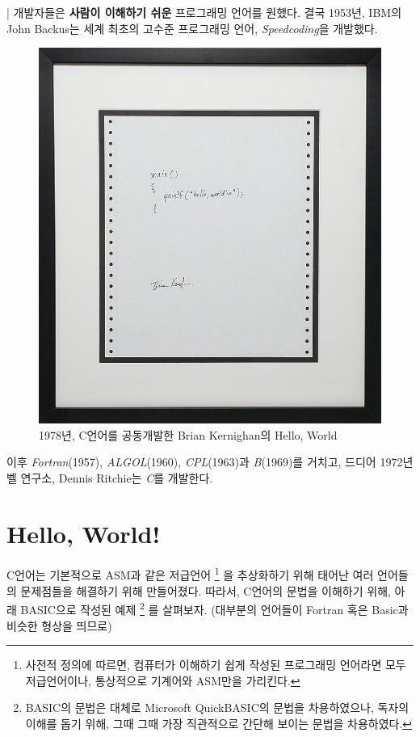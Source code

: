 \documentclass{article}
\begin{document}
| 개발자들은 \textbf{사람이 이해하기 쉬운} 프로그래밍 언어를 원했다.
결국 1953년, IBM의 John Backus는 세계 최초의 고수준 프로그래밍 언어,
\textit{Speedcoding}을 개발했다.

\begin{figure}[!h]
    \centering
    \includegraphics[width=\linewidth]{images/hello-world.jpg}
    \caption{1978년, C언어를 공동개발한 Brian Kernighan의 Hello, World}
\end{figure}

이후 \textit{Fortran}(1957), \textit{ALGOL}(1960), \textit{CPL}(1963)과
\textit{B}(1969)를 거치고, 드디어 1972년 벨 연구소, Dennis Ritchie는
\textit{C}를 개발한다.

\pagebreak

\section{Hello, World!}

C언어는 기본적으로 ASM과 같은 저급언어
\footnote{
    사전적 정의에 따르면, 컴퓨터가 이해하기 쉽게 작성된 프로그래밍 언어라면 모두 저급언어이나, 
    통상적으로 기계어와 ASM만을 가리킨다.
}
을 추상화하기 위해 태어난 여러 언어들의 문제점들을 해결하기 위해 만들어졌다.
따라서, C언어의 문법을 이해하기 위해, 아래 BASIC으로 작성된 예제
\footnote{
    BASIC의 문법은 대체로 Microsoft QuickBASIC의 문법을 차용하였으나,
    독자의 이해를 돕기 위해, 그때 그때 가장 직관적으로 간단해 보이는 문법을 차용하였다.
}
를 살펴보자.
(대부분의 언어들이 Fortran 혹은 Basic과 비슷한 형상을 띄므로)
\end{document}
